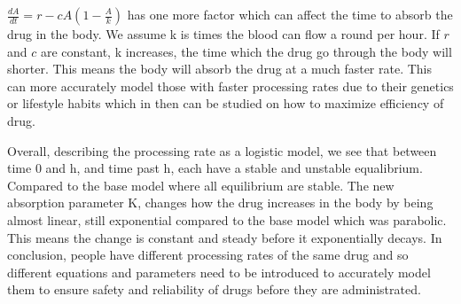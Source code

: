 \documentclass{article}
\begin{document}
$\frac{dA}{dt}=r-cA(1-\frac{A}{k})$ has one more factor which can affect the time to absorb the drug in the body. We assume k is times the blood can flow a round per hour. If $r$ and $c$ are constant, k increases, the time which the drug go through the body will shorter. This means the body will absorb the drug at a much faster rate. This can more accurately model those with faster processing rates due to their genetics or lifestyle habits which in then can be studied on how to maximize efficiency of drug. 

Overall, describing the processing rate as a logistic model, we see that between time 0 and h, and time past h, each have a stable and unstable equalibrium. Compared to the base model where all equilibrium are stable. The new absorption parameter K, changes how the drug increases in the body by being almost linear, still exponential compared to the base model which was parabolic. This means the change is constant and steady before it exponentially decays. In conclusion, people have different processing rates of the same drug and so different equations and parameters need to be introduced to accurately model them to ensure safety and reliability of drugs before they are administrated. 
\end{document}
